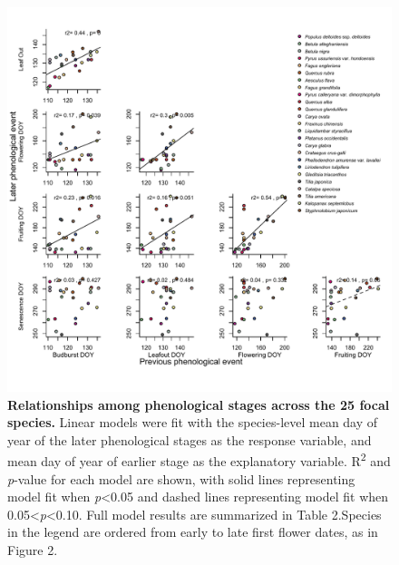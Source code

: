 \documentclass{article}
\begin{document}
  \begin{figure}[h]
  \centering
  \includegraphics{../analyses/figures/latevearly_rp_col_legend.pdf}
  
  \caption{\textbf{Relationships among phenological stages across the 25 focal species.} Linear models were fit with the species-level mean day of year of the later phenological stages as the response variable, and mean day of year of earlier stage as the explanatory variable. R\textsuperscript{2} and \textit{p}-value for each model are shown, with solid lines representing model fit when \textit{p}<0.05 and dashed lines representing model fit when 0.05<\textit{p}<0.10. Full model results are summarized in Table 2.Species in the legend are ordered from early to late first flower dates, as in Figure 2.}
  \label{fig:latevearly}
\end{figure}
\end{document}

